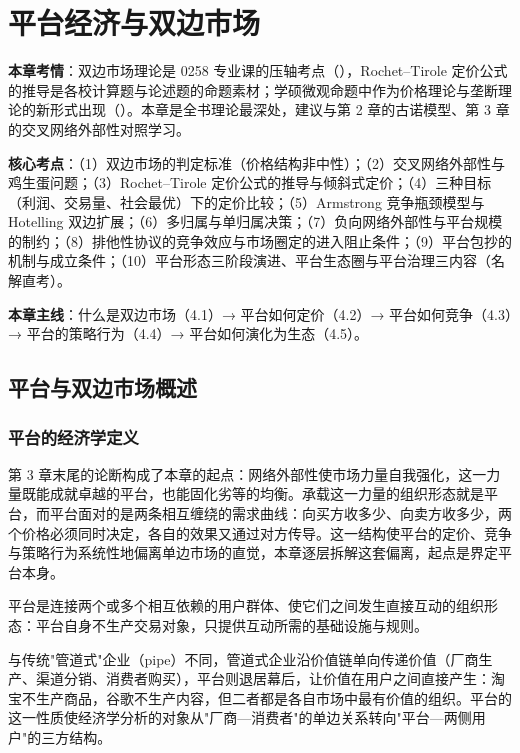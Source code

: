 \chapter{平台经济与双边市场}

\begin{examguide}
\textbf{本章考情}：双边市场理论是 0258 专业课的压轴考点（），Rochet–Tirole 定价公式的推导是各校计算题与论述题的命题素材；学硕微观命题中作为价格理论与垄断理论的新形式出现（）。本章是全书理论最深处，建议与第 2 章的古诺模型、第 3 章的交叉网络外部性对照学习。

\textbf{核心考点}：（1）双边市场的判定标准（价格结构非中性）；（2）交叉网络外部性与鸡生蛋问题；（3）Rochet–Tirole 定价公式的推导与倾斜式定价；（4）三种目标（利润、交易量、社会最优）下的定价比较；（5）Armstrong 竞争瓶颈模型与 Hotelling 双边扩展；（6）多归属与单归属决策；（7）负向网络外部性与平台规模的制约；（8）排他性协议的竞争效应与市场圈定的进入阻止条件；（9）平台包抄的机制与成立条件；（10）平台形态三阶段演进、平台生态圈与平台治理三内容（名解直考）。

\textbf{本章主线}：什么是双边市场（4.1）→ 平台如何定价（4.2）→ 平台如何竞争（4.3）→ 平台的策略行为（4.4）→ 平台如何演化为生态（4.5）。
\end{examguide}

\section{平台与双边市场概述}

\subsection{平台的经济学定义}

第 3 章末尾的论断构成了本章的起点：网络外部性使市场力量自我强化，这一力量既能成就卓越的平台，也能固化劣等的均衡。承载这一力量的组织形态就是平台，而平台面对的是两条相互缠绕的需求曲线：向买方收多少、向卖方收多少，两个价格必须同时决定，各自的效果又通过对方传导。这一结构使平台的定价、竞争与策略行为系统性地偏离单边市场的直觉，本章逐层拆解这套偏离，起点是界定平台本身。

\begin{definition}[平台（platform）]
平台是连接两个或多个相互依赖的用户群体、使它们之间发生直接互动的组织形态：平台自身不生产交易对象，只提供互动所需的基础设施与规则。
\end{definition}

与传统"管道式"企业（pipe）不同，管道式企业沿价值链单向传递价值（厂商生产、渠道分销、消费者购买），平台则退居幕后，让价值在用户之间直接产生：淘宝不生产商品，谷歌不生产内容，但二者都是各自市场中最有价值的组织。平台的这一性质使经济学分析的对象从"厂商—消费者"的单边关系转向"平台—两侧用户"的三方结构。


